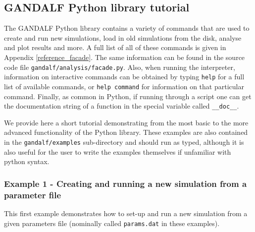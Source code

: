 \documentclass[a4paper]{article}
\newcommand{\var}[1]{\texttt{#1}}
\begin{document}



\subsection{GANDALF Python library tutorial} \label{SS:PYTHONTUTORIAL}
The GANDALF Python library contains a variety of commands that are used to create and run new simulations, load in old simulations from the disk, analyse and plot results and more.  A full list of all of these commands is given in Appendix \ref{reference_facade}.  The same information can be found in the source code file \var{gandalf/analysis/facade.py}.  Also, when running the interpreter, information on interactive commands can be obtained by typing \var{help} for a full list of available commands, or \var{help command} for information on that particular command. Finally, as common in Python, if running through a script one can get the documentation string of a function in the special variable called \lstinline{__doc__}.

We provide here a short tutorial demonstrating from the most basic to the more advanced functionality of the Python library.  These examples are also contained in the \var{gandalf/examples} sub-directory and should run as typed, although it is also useful for the user to write the examples themselves if unfamiliar with python syntax. \\
\newline


\subsubsection{Example 1 - Creating and running a new simulation from a parameter file}
This first example demonstrates how to set-up and run a new simulation from a given parameters file (nominally called \var{params.dat} in these examples).  \\
\end{document}

